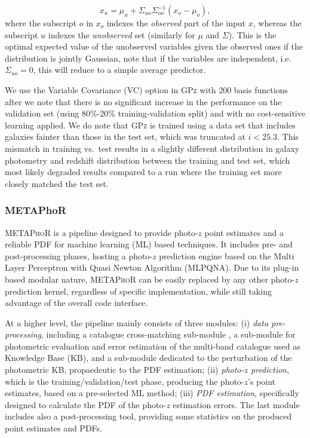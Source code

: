\begin{equation}
x_{u} = \mu_{u}+\Sigma_{uo}\Sigma_{oo}^{-1}(x_{o}-\mu_{o}),
\end{equation}  %
where the subscript $o$ in $x_{o}$ indexes the \emph{observed} part of the input $x$, whereas the subscript $u$ indexes the \emph{unobserved} set (similarly for $\mu$ and $\Sigma$). This is the optimal expected value of the unobserved variables given the observed ones if the distribution is jointly Gaussian, note that if the variables are independent, i.e. $\Sigma_{uo}=0$, this will reduce to a simple average predictor.

We use the Variable Covariance (VC) option in \textsc{GPz} with 200 basis functions after we note that there is no significant increase in the performance on the validation set (using 80\%-20\% training-validation split) and with no cost-sensitive learning applied.  We do note that \textsc{GPz} is trained using a data set that includes galaxies fainter than those in the test set, which was truncated at $i<25.3$.  This mismatch in training vs.~test results in a slightly different distribution in galaxy photometry and redshift distribution between the training and test set, which most likely degraded results compared to a run where the training set more closely matched the test set.

\subsubsection{METAPhoR}
\label{sec:metaphor}
\textsc{METAPhoR} \citep[Machine-learning Estimation Tool for Accurate Photometric Redshifts,][]{Cavuoti:17} is a pipeline designed to provide photo-$z$ point estimates and a reliable PDF for machine learning (ML) based techniques. It includes pre- and post-processing phases, hosting a photo-$z$ prediction engine based on the Multi Layer Perceptron with Quasi Newton Algorithm (MLPQNA).
Due to its plug-in based modular nature, \textsc{METAPhoR} can be easily replaced by any other photo-$z$ prediction kernel, regardless of specific implementation, while still taking advantage of the overall code interface.

At a higher level, the pipeline mainly consists of three modules: (i) \textit{data pre-processing}, including a catalogue cross-matching sub-module \citep[based on the tool C3, ][]{Riccio:17}, a sub-module for photometric evaluation and error estimation of the multi-band catalogue used as Knowledge Base (KB), and a sub-module dedicated to the perturbation of the photometric KB, propaedeutic to the PDF estimation; (ii) \textit{photo-$z$ prediction}, which is the training/validation/test phase, producing the photo-$z$'s point estimates, based on a pre-selected ML method; (iii) \textit{PDF estimation}, specifically designed to calculate the PDF of the photo-$z$ estimation errors. The last module includes also a post-processing tool, providing some statistics on the produced point estimates and PDFs.

